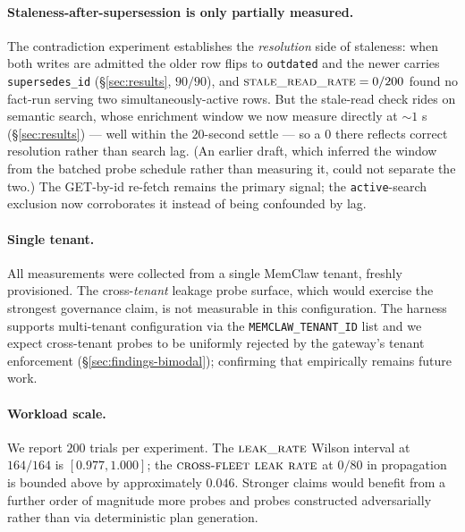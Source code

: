 \documentclass[10pt,twocolumn,letterpaper]{article}
\begin{document}
\paragraph{Staleness-after-supersession is only partially measured.}
The contradiction experiment establishes the \emph{resolution} side of staleness: when both writes are admitted the older row flips to \texttt{outdated} and the newer carries \texttt{supersedes\_id} (\S\ref{sec:results}, \(90/90\)), and \(\textsc{stale\_read\_rate} = 0/200\) found no fact-run serving two simultaneously-active rows. But the stale-read check rides on semantic search, whose enrichment window we now measure directly at \(\sim\!1\) s (\S\ref{sec:results}) --- well within the \(20\)-second settle --- so a \(0\) there reflects correct resolution rather than search lag. (An earlier draft, which inferred the window from the batched probe schedule rather than measuring it, could not separate the two.) The GET-by-id re-fetch remains the primary signal; the \texttt{active}-search exclusion now corroborates it instead of being confounded by lag.

\paragraph{Single tenant.}
All measurements were collected from a single MemClaw tenant, freshly provisioned. The cross-\emph{tenant} leakage probe surface, which would exercise the strongest governance claim, is not measurable in this configuration. The harness supports multi-tenant configuration via the \texttt{MEMCLAW\_TENANT\_ID} list and we expect cross-tenant probes to be uniformly rejected by the gateway's tenant enforcement (\S\ref{sec:findings-bimodal}); confirming that empirically remains future work.

\paragraph{Workload scale.}
We report \(200\) trials per experiment. The \(\textsc{leak\_rate}\) Wilson interval at \(164/164\) is \([0.977, 1.000]\); the \(\textsc{cross-fleet leak rate}\) at \(0/80\) in propagation is bounded above by approximately \(0.046\). Stronger claims would benefit from a further order of magnitude more probes and probes constructed adversarially rather than via deterministic plan generation.
\end{document}
